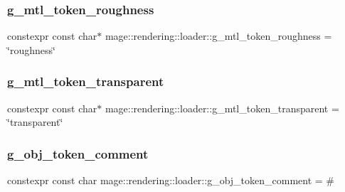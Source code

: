 \hypertarget{namespacemage_1_1rendering_1_1loader_a015526da8f15dd6d21e15237b02c31ca}{}\label{namespacemage_1_1rendering_1_1loader_a015526da8f15dd6d21e15237b02c31ca} 
\subsubsection{\texorpdfstring{g\+\_\+mtl\+\_\+token\+\_\+roughness}{g\_mtl\_token\_roughness}}
{\footnotesize\ttfamily constexpr const char$\ast$ mage\+::rendering\+::loader\+::g\+\_\+mtl\+\_\+token\+\_\+roughness = \char`\"{}roughness\char`\"{}}

\hypertarget{namespacemage_1_1rendering_1_1loader_a82441a9046f13d0a294d689d4a83a651}{}\label{namespacemage_1_1rendering_1_1loader_a82441a9046f13d0a294d689d4a83a651} 
\subsubsection{\texorpdfstring{g\+\_\+mtl\+\_\+token\+\_\+transparent}{g\_mtl\_token\_transparent}}
{\footnotesize\ttfamily constexpr const char$\ast$ mage\+::rendering\+::loader\+::g\+\_\+mtl\+\_\+token\+\_\+transparent = \char`\"{}transparent\char`\"{}}

\hypertarget{namespacemage_1_1rendering_1_1loader_a28d2091ac0bc8a30979e417ca93adfb9}{}\label{namespacemage_1_1rendering_1_1loader_a28d2091ac0bc8a30979e417ca93adfb9} 
\subsubsection{\texorpdfstring{g\+\_\+obj\+\_\+token\+\_\+comment}{g\_obj\_token\_comment}}
{\footnotesize\ttfamily constexpr const char mage\+::rendering\+::loader\+::g\+\_\+obj\+\_\+token\+\_\+comment = \textquotesingle{}\#\textquotesingle{}}


